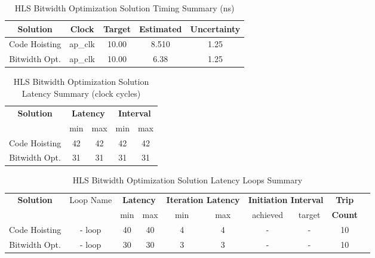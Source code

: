 \begin{table}[H]
	\centering
	\begin{tabular}{|c|c|c|c|c|}
		\hline
		\textbf{Solution} & \textbf{Clock} & \textbf{Target} & \textbf{Estimated} & \textbf{Uncertainty} \\
		\hline
		Code Hoisting & ap\_clk & 10.00 & 8.510 & 1.25 \\
		\hline
		Bitwidth Opt. & ap\_clk & 10.00 & 6.38 & 1.25 \\
		\hline
	\end{tabular}
	\caption{HLS Bitwidth Optimization Solution Timing Summary (ns)}
	\label{tab:hls-bitwidth-optimization-solution-timing-summary}
\end{table}

\begin{table}[H]
	\centering
	\begin{tabular}{|c|c|c|c|c|}
		\hline
		\multicolumn{1}{|c|}{\textbf{Solution}} & \multicolumn{2}{|c|}{\textbf{Latency}} & \multicolumn{2}{|c|}{\textbf{Interval}} \\
		& min & max & min & max \\
		\hline
		Code Hoisting & 42 & 42 & 42 & 42 \\
		\hline
		Bitwidth Opt. & 31 & 31 & 31 & 31 \\
		\hline
	\end{tabular}
	\caption{HLS Bitwidth Optimization Solution Latency Summary (clock cycles)}
	\label{tab:hls-bitwidth-optimization-solution-latency-summary}
\end{table}

\begin{table}[H]
	\centering
	\begin{tabular}{|c|c|c|c|c|c|c|c|c|c|}
		\hline
		\multicolumn{1}{|c|}{\textbf{Solution}} & \multicolumn{1}{|c|}{Loop Name} & \multicolumn{2}{|c|}{\textbf{Latency}} & \multicolumn{2}{c|}{\textbf{Iteration Latency}} & \multicolumn{2}{c|}{\textbf{Initiation Interval}} & \multicolumn{1}{c|}{\textbf{Trip}}  \\
		&  & min & max & min & max & achieved & target & \textbf{Count} \\
		\hline
		Code Hoisting & - loop & 40 & 40 & 4 & 4 & - & - & 10 \\
		\hline
		Bitwidth Opt. & - loop & 30 & 30 & 3 & 3 & - & - & 10 \\
		\hline
	\end{tabular}
	\caption{HLS Bitwidth Optimization Solution Latency Loops Summary }
	\label{tab:hls-bitwidth-optimization-solution-loop-summary}
\end{table}

